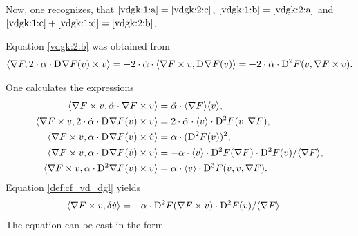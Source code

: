 Now, one recognizes, that $ \eqref{vdgk:1:a}  =  \eqref{vdgk:2:c} $,
$ \eqref{vdgk:1:b}  =  \eqref{vdgk:2:a} $ and
$ \eqref{vdgk:1:c} + \eqref{vdgk:1:d}  =  \eqref{vdgk:2:b} $.

Equation \eqref{vdgk:2:b} was obtained from
\begin{align*}
    \langle  \nabla F ,  2 \cdot \dot{ \alpha } \cdot \mathrm{D}^{  }\nabla F( v ) \times v  \rangle   =
    - 2 \cdot \dot{ \alpha } \cdot
    \langle  \nabla F \times v ,  \mathrm{D}^{  } \nabla F( v )   \rangle   =
    - 2 \cdot \dot{ \alpha } \cdot \mathrm{D}^{ 2 }F( v, \nabla F \times v ) .
\end{align*}




One calculates the expressions
\begin{subequations}
    \begin{align}
        \langle  \nabla F  \times v ,  \ddot{ \alpha } \cdot \nabla F  \times v  \rangle
        &=
        \ddot{ \alpha } \cdot \langle  \nabla F   \rangle \langle  v  \rangle ,
        \\
        \langle  \nabla F  \times v ,  2 \cdot \dot{ \alpha } \cdot \mathrm{D}^{  } \nabla F  ( v ) \times v  \rangle
        &=
        2 \cdot \dot{ \alpha } \cdot \langle  v  \rangle \cdot \mathrm{D}^{ 2 } F ( v, \nabla F  ) ,
        \\
        \langle  \nabla F  \times v ,  \alpha \cdot \mathrm{D}^{  } \nabla F  ( v ) \times \dot{ v }  \rangle
        &=
        \alpha \cdot  ( \mathrm{D}^{ 2 } F ( v ) )^2 ,
        \\
        \langle  \nabla F  \times v ,  \alpha \cdot \mathrm{D}^{  } \nabla F  ( \dot{ v } ) \times v  \rangle
        &=
        - \alpha \cdot \langle  v  \rangle \cdot \mathrm{D}^{ 2 } F ( \nabla F  ) \cdot
        \mathrm{D}^{ 2 } F ( v ) / \langle  \nabla F   \rangle ,
        \\
        \langle  \nabla F  \times v ,  \alpha \cdot \mathrm{D}^{ 2 } \nabla F  ( v ) \times v  \rangle
        &=
        \alpha \cdot \langle  v  \rangle \cdot \mathrm{D}^{ 3 } F ( v, v, \nabla F  ) .
    \end{align}
\end{subequations}
Equation \eqref{def:cf_vd_dgl} yields
\begin{align}
    \langle  \nabla F  \times v ,  \delta \dot{ v }  \rangle
    &=
    -\alpha \cdot \mathrm{D}^{ 2 } F ( \nabla F  \times v ) \cdot
    \mathrm{D}^{ 2 } F ( v ) / \langle  \nabla F   \rangle .
\end{align}
The equation can be cast in the form
